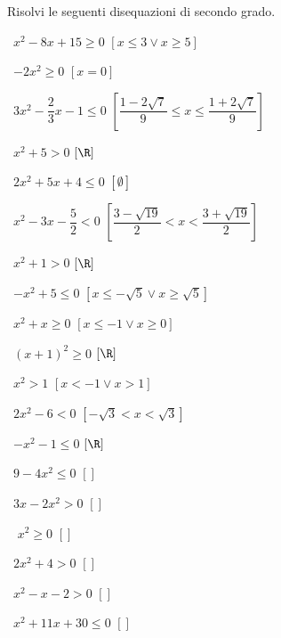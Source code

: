 \begin{esercizio}[*]
 \label{ese:4.4}
Risolvi le seguenti disequazioni di secondo grado.
\vspace{\dy}
\begin{htmulticols}{2}
 \begin{enumeratea}
 \item~\(x^2-8x+15\ge 0\) \hfill \(\left[x\le 3\vee x\ge 5\right]\)
 \item~\(-2x^2\ge 0\) \hfill \(\left[x=0\right]\)
 \item~\(3x^2-\dfrac 2 3x-1\le 0\) 
  \hfill \(\left[\dfrac{1-2\sqrt 7} 9\le x\le \dfrac{1+2\sqrt 7} 9\right]\)
 \item~\(x^2+5>0\) \hfill \(\left[\R\right]\)
 \item~\(2x^2+5x+4\le 0\) \hfill \(\left[\emptyset\right]\)
 \item~\(x^2-3x-\dfrac 5 2<0\) 
  \hfill \(\left[\dfrac{3-\sqrt{19}} 2<x<\dfrac{3+\sqrt{19}} 2\right]\)
 \item~\(x^2+1>0\) \hfill \(\left[\R\right]\)
 \item~\(-x^2+5\le 0\) \hfill \(\left[x\le -\sqrt 5\vee x\ge \sqrt 5\right]\)
 \item~\(x^2+x\ge 0\) \hfill \(\left[x\le -1\vee x\ge 0\right]\)
 \item~\((x+1)^2\ge 0\) \hfill \(\left[\R\right]\)
 \item~\(x^2>1\) \hfill \(\left[x<-1\vee x>1\right]\)
 \item~\(2x^2-6<0\) \hfill \(\left[-\sqrt 3<x<\sqrt 3\right]\)
 \item~\(-x^2-1\le 0\) \hfill \(\left[\R\right]\)
 \item~\(9-4x^2\le 0\) \hfill \(\left[\right]\)
 \item~\(3x-2x^2>0\) \hfill \(\left[\right]\)
 \item~ \(x^2\ge 0\) \hfill \(\left[\right]\)
 \item~\(2x^2+4>0\) \hfill \(\left[\right]\)
 \item~\(x^2-x-2>0\) \hfill \(\left[\right]\)
 \item~\(x^2+11x+30\le 0\) \hfill \(\left[\right]\)
 \end{enumeratea}
 \end{htmulticols}
\end{esercizio}

